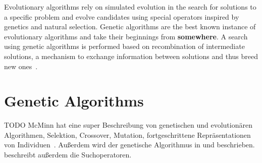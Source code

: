 \documentclass[paper=a4,%
  twoside,%
  BCOR4mm,%
  abstract=true,%
  toc=bibliography,%
  chapterprefix=true,%
  toc=bibliographynumbered,%
  open=right,%
  english,%
  pagesize=pdftex]{scrreprt}
\begin{document}
Evolutionary algorithms rely on simulated evolution in the search for solutions to a specific problem and evolve candidates using special operators inspired by genetics and natural selection. Genetic algorithms are the best known instance of evolutionary algorithms and take their beginnings from \textbf{somewhere}. A search using genetic algorithms is performed based on recombination of intermediate solutions, a mechanism to exchange information between solutions and thus breed new ones~\cite{McMinn_2004}.

\section{Genetic Algorithms}
TODO McMinn hat eine super Beschreibung von genetischen und evolutionären Algorithmen, Selektion, Crossover, Mutation, fortgeschrittene Repräsentationen von Individuen~\cite{McMinn_2004}. Außerdem wird der genetische Algorithmus in \cite{Fraser2011} und \cite{Fraser_2013} beschrieben. \cite{Fraser_2013} beschreibt außerdem die Suchoperatoren.


\end{document}
